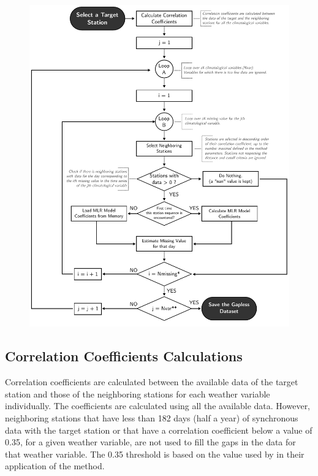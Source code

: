 \documentclass[TechnicalNoteMeteo.tex]{subfiles}
\begin{document}
\begin{figure}[!p]
    \centering
    \includegraphics[width=\textwidth]{img/Flowchart-filling_missing_weather.pdf} 
    \caption{}
    \label{fig:fillworker_flowchart}
\end{figure}

\subsection{Correlation Coefficients Calculations}

Correlation coefficients are calculated between the available data of the target station and those of the neighboring stations for each weather variable individually. The coefficients are calculated using all the available data. However, neighboring stations that have less than 182 days (half a year) of synchronous data with the target station or that have a correlation coefficient below a value of 0.35, for a given weather variable, are not used to fill the gaps in the data for that weather variable. The 0.35 threshold is based on the value used by \cite{eischeid_creating_2000} in their application of the method. 
\end{document}
